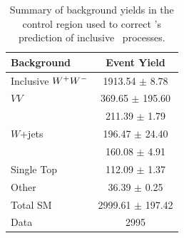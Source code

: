 \begin{table}
\centering
\begin{tabular}{|l|c|}
\hline
		Background                 & Event Yield \\
\hline\hline
    Inclusive $W^+W^-$             & 1913.54 $\pm$ 8.78 \\
    $VV$               					& 369.65 $\pm$ 195.60  \\
    \ttbar           					  & 211.39 $\pm$ 1.79 \\
		$W$+jets										& 196.47   $\pm$ 24.40 \\
		\Ztau												& 160.08 $\pm$ 4.91 \\
		Single Top                  & 112.09 $\pm$ 1.37 \\
		Other 											& 36.39  $\pm$ 0.25 \\	
    \hline
    Total SM                    & 2999.61 $\pm$ 197.42  \\
    Data                        & 2995             \\
\hline
\end{tabular}
\caption{Summary of background yields in the control region used to correct \PowhegPythiaEight's 
prediction of inclusive \WW\ processes.}
\label{tab:WWyields}
\end{table}


